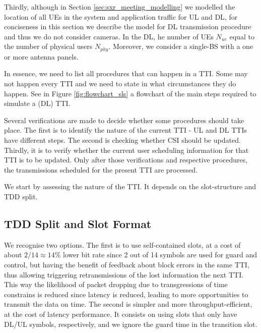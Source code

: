 Thirdly, although in Section \ref{sec:sxr_meeting_modelling} we modelled the location of all \acsp{UE} in the system and application traffic for \acs{UL} and \acs{DL}, for conciseness in this section we describe the model for \acs{DL} transmission procedure and thus we do not consider cameras. In the \acs{DL}, he number of UEs $N_{ue}$ equal to the number of physical users $N_{phy}$. Moreover, we consider a single-BS with a one or more antenna panels.

In essence, we need to list all procedures that can happen in a \acs{TTI}. Some may not happen every \acs{TTI} and we need to state in what circumstances they do happen. See in Figure \ref{fig:flowchart_sls} a flowchart of the main steps required to simulate a (\acs{DL}) \acs{TTI}.


Several verifications are made to decide whether some procedures should take place. The first is to identify the nature of the current \acs{TTI} - UL and DL TTIs have different steps. The second is checking whether CSI should be updated. Thirdly, it is to verify whether the current user scheduling information for that TTI is to be updated. Only after those verifications and respective procedures, the transmissions scheduled for the present TTI are processed. 

We start by assessing the nature of the TTI. It depends on the slot-structure and TDD split.

\subsection*{TDD Split and Slot Format}

We recognise two options. The first is to use self-contained slots, at a cost of about $2/14 \approx 14\%$ lower bit rate since 2 out of 14 symbols are used for guard and control, but having the benefit of feedback about block errors in the same TTI, thus allowing triggering retransmissions of the lost information the next TTI. This way the likelihood of packet dropping due to transgressions of time constrains is reduced since latency is reduced, leading to more opportunities to transmit the data on time. The second is simpler and more throughput-efficient, at the cost of latency performance. It consists on using slots that only have \ac{DL}/\ac{UL} symbols, respectively, and we ignore the guard time in the transition slot.

